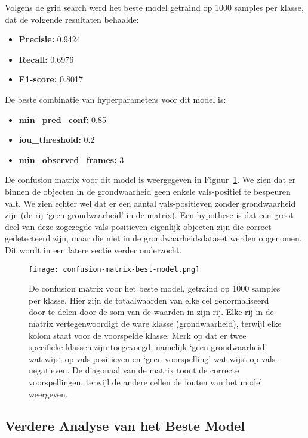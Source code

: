 Volgens de grid search werd het beste model getraind op 1000 samples per klasse, dat de volgende resultaten behaalde:
\begin{itemize}
    \item \textbf{Precisie:} 0.9424
    \item \textbf{Recall:} 0.6976
    \item \textbf{F1-score:} 0.8017
\end{itemize}
De beste combinatie van hyperparameters voor dit model is:
\begin{itemize}
    \item \textbf{min\_pred\_conf:} 0.85
    \item \textbf{iou\_threshold:} 0.2
    \item \textbf{min\_observed\_frames:} 3
\end{itemize}
De confusion matrix voor dit model is weergegeven in Figuur~\ref{fig:confusion-matrix-best-model}.
We zien dat er binnen de objecten in de grondwaarheid geen enkele vals-positief te bespeuren valt.
We zien echter wel dat er een aantal vals-positieven zonder grondwaarheid zijn (de rij `geen grondwaarheid' in de matrix).
Een hypothese is dat een groot deel van deze zogezegde vals-positieven eigenlijk objecten zijn die correct gedetecteerd zijn, 
maar die niet in de grondwaarheidsdataset werden opgenomen.
Dit wordt in een latere sectie verder onderzocht.

\begin{figure}[H]
  \centering
  \texttt{[image: confusion-matrix-best-model.png]}
  \caption[
    Confusion matrix voor het beste model, getraind op 1000 samples per klasse
  ]{\label{fig:confusion-matrix-best-model} 
    De confusion matrix voor het beste model, getraind op 1000 samples per klasse.
    Hier zijn de totaalwaarden van elke cel genormaliseerd door te delen door de som van de waarden in zijn rij.
    Elke rij in de matrix vertegenwoordigt de ware klasse (grondwaarheid),
    terwijl elke kolom staat voor de voorspelde klasse.
    Merk op dat er twee specifieke klassen zijn toegevoegd, namelijk `geen grondwaarheid' 
    wat wijst op vals-positieven en `geen voorspelling' wat wijst op vals-negatieven.
    De diagonaal van de matrix toont de correcte voorspellingen,
    terwijl de andere cellen de fouten van het model weergeven.
  }
\end{figure}

\subsection{Verdere Analyse van het Beste Model}
\label{sec:analyse-beste-model}

